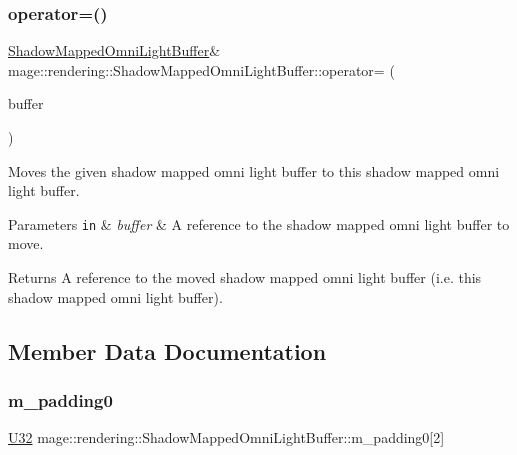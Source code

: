 \subsubsection{\texorpdfstring{operator=()}{operator=()}\hspace{0.1cm}{\footnotesize\ttfamily [2/2]}}
{\footnotesize\ttfamily \mbox{\hyperlink{structmage_1_1rendering_1_1_shadow_mapped_omni_light_buffer}{Shadow\+Mapped\+Omni\+Light\+Buffer}}\& mage\+::rendering\+::\+Shadow\+Mapped\+Omni\+Light\+Buffer\+::operator= (\begin{DoxyParamCaption}\item[{\mbox{\hyperlink{structmage_1_1rendering_1_1_shadow_mapped_omni_light_buffer}{Shadow\+Mapped\+Omni\+Light\+Buffer}} \&\&}]{buffer }\end{DoxyParamCaption})\hspace{0.3cm}{\ttfamily [default]}}

Moves the given shadow mapped omni light buffer to this shadow mapped omni light buffer.


\begin{DoxyParams}[1]{Parameters}
\mbox{\tt in}  & {\em buffer} & A reference to the shadow mapped omni light buffer to move. \\
\hline
\end{DoxyParams}
\begin{DoxyReturn}{Returns}
A reference to the moved shadow mapped omni light buffer (i.\+e. this shadow mapped omni light buffer). 
\end{DoxyReturn}


\subsection{Member Data Documentation}
\mbox{\label{structmage_1_1rendering_1_1_shadow_mapped_omni_light_buffer_a01a76a39534ba04a2b1fe77ae5d1522c}} 
\subsubsection{\texorpdfstring{m\+\_\+padding0}{m\_padding0}}
{\footnotesize\ttfamily \mbox{\hyperlink{namespacemage_aa5d6eaabaac3cdd01873d6a3d27e90f3}{U32}} mage\+::rendering\+::\+Shadow\+Mapped\+Omni\+Light\+Buffer\+::m\+\_\+padding0\mbox{[}2\mbox{]}}

